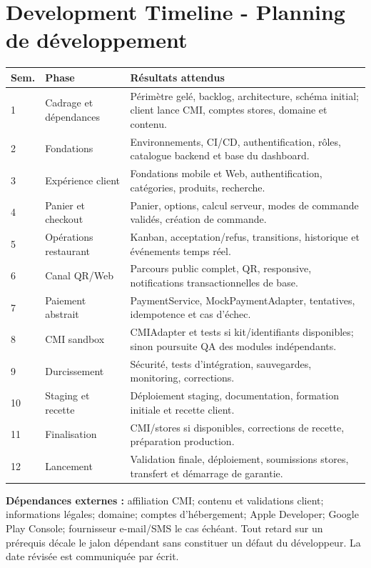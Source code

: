 \documentclass[10pt,a4paper]{article}
\begin{document}
\section{Development Timeline - Planning de développement}
\begin{longtable}{@{}L{1.5cm}L{4.0cm}L{9.9cm}@{}}
\toprule
\textbf{Sem.} & \textbf{Phase} & \textbf{Résultats attendus} \\
\midrule
{} & Cadrage et dépendances & Périmètre gelé, backlog, architecture, schéma initial; client lance CMI, comptes stores, domaine et contenu. \\
2 & Fondations & Environnements, CI/CD, authentification, rôles, catalogue backend et base du dashboard. \\
3 & Expérience client & Fondations mobile et Web, authentification, catégories, produits, recherche. \\
4 & Panier et checkout & Panier, options, calcul serveur, modes de commande validés, création de commande. \\
5 & Opérations restaurant & Kanban, acceptation/refus, transitions, historique et événements temps réel. \\
6 & Canal QR/Web & Parcours public complet, QR, responsive, notifications transactionnelles de base. \\
7 & Paiement abstrait & PaymentService, MockPaymentAdapter, tentatives, idempotence et cas d'échec. \\
8 & CMI sandbox & CMIAdapter et tests si kit/identifiants disponibles; sinon poursuite QA des modules indépendants. \\
9 & Durcissement & Sécurité, tests d'intégration, sauvegardes, monitoring, corrections. \\
10 & Staging et recette & Déploiement staging, documentation, formation initiale et recette client. \\
11 & Finalisation & CMI/stores si disponibles, corrections de recette, préparation production. \\
12 & Lancement & Validation finale, déploiement, soumissions stores, transfert et démarrage de garantie. \\
\bottomrule
\end{longtable}

\textbf{Dépendances externes :} affiliation CMI; contenu et validations client; informations légales; domaine; comptes d'hébergement; Apple Developer; Google Play Console; fournisseur e-mail/SMS le cas échéant. Tout retard sur un prérequis décale le jalon dépendant sans constituer un défaut du développeur. La date révisée est communiquée par écrit.
\end{document}
